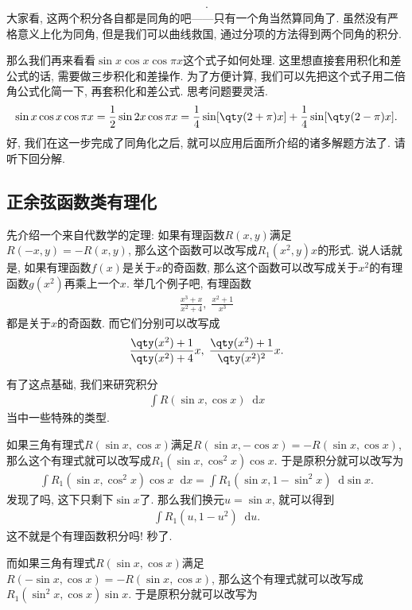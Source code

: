 \documentclass{ctexbook}
\newcommand*{\dif}{\mathop{}\!\mathrm{d}}
\begin{document}
{\begin{align*}
.\end{align*}
大家看, 这两个积分各自都是同角的吧——只有一个角当然算同角了. 虽然没有严格意义上化为同角, 但是我们可以曲线救国, 通过分项的方法得到两个同角的积分. \par
那么我们再来看看$\sin{x}\cos{x}\cos{\pi x}$这个式子如何处理. 这里想直接套用积化和差公式的话, 需要做三步积化和差操作. 为了方便计算, 我们可以先把这个式子用二倍角公式化简一下, 再套积化和差公式. 思考问题要灵活. 
\begin{align*}
\sin{x}\cos{x}\cos{\pi x}=\frac{1}{2}\sin{2x}\cos{\pi x}=\frac{1}{4}\sin[\qty(2+\pi)x]+\frac{1}{4}\sin[\qty(2-\pi)x]
.\end{align*}
好, 我们在这一步完成了同角化之后, 就可以应用后面所介绍的诸多解题方法了. 请听下回分解. \par
\subsection{正余弦函数类有理化}
先介绍一个来自代数学的定理: 如果有理函数$R(x,y)$满足$R(-x,y)=-R(x,y)$, 那么这个函数可以改写成$R_{1}(x^{2},y)x$的形式. 说人话就是, 如果有理函数$f(x)$是关于$x$的奇函数, 那么这个函数可以改写成关于$x^{2}$的有理函数$g(x^{2})$再乘上一个$x$. 举几个例子吧, 有理函数
\begin{align*}
\frac{x^{3}+x}{x^{2}+4},\;\frac{x^{2}+1}{x^{3}}
\end{align*}
都是关于$x$的奇函数. 而它们分别可以改写成
\begin{align*}
\frac{\qty(x^{2})+1}{\qty(x^{2})+4}x,\;\frac{\qty(x^{2})+1}{\qty(x^{2})^{2}}x
.\end{align*}\par
有了这点基础, 我们来研究积分
\begin{align*}
\int R(\sin{x},\cos{x})\dif{x}
\end{align*}
当中一些特殊的类型. \par
如果三角有理式$R(\sin{x},\cos{x})$满足$R(\sin{x},-\cos{x})=-R(\sin{x},\cos{x})$, 那么这个有理式就可以改写成$R_{1}(\sin{x},\cos^{2}{x})\cos{x}$. 于是原积分就可以改写为
\begin{align*}
\int R_{1}(\sin{x},\cos^{2}{x})\cos{x}\dif{x}=\int R_{1}(\sin{x},1-\sin^{2}{x})\dif{\sin{x}}
.\end{align*}
发现了吗, 这下只剩下$\sin{x}$了. 那么我们换元$u=\sin{x}$, 就可以得到
\begin{align*}
\int R_{1}(u,1-u^{2})\dif{u}
.\end{align*}
这不就是个有理函数积分吗! 秒了. \par
而如果三角有理式$R(\sin{x},\cos{x})$满足$R(-\sin{x},\cos{x})=-R(\sin{x},\cos{x})$, 那么这个有理式就可以改写成$R_{1}(\sin^{2}{x},\cos{x})\sin{x}$. 于是原积分就可以改写为
}
\end{document}
